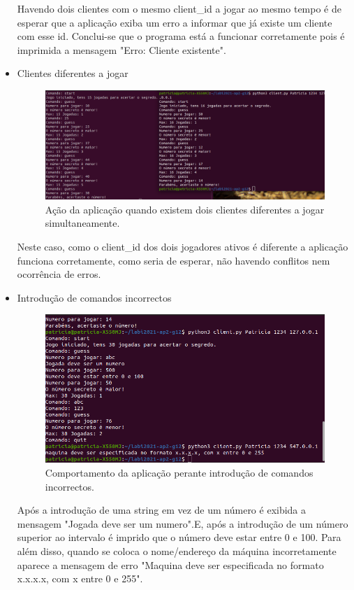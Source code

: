\documentclass{report}
\begin{document}
\begin{itemize}
Havendo dois clientes com o mesmo client\_id a jogar ao mesmo tempo é de esperar que a aplicação exiba um erro a informar que já existe um cliente com esse id. Conclui-se que o programa está a funcionar corretamente pois é imprimida a mensagem "Erro: Cliente existente".

\item Clientes diferentes a jogar
\begin{figure}[H]
        \centering
        \includegraphics[scale=0.36]{doisclients}      
        \caption{Ação da aplicação quando existem dois clientes diferentes a jogar simultaneamente.}
\end{figure}

Neste caso, como o client\_id dos dois jogadores ativos é diferente a aplicação funciona corretamente, como seria de esperar, não havendo conflitos nem ocorrência de erros.

\item Introdução de comandos incorrectos
\begin{figure}[H]
        \centering
        \includegraphics[scale=0.53]{errospropositados}      
        \caption{Comportamento da aplicação perante introdução de comandos incorrectos.}
\end{figure}

Após a introdução de uma string em vez de um número é exibida a mensagem "Jogada deve ser um numero".E, após a introdução de um número superior ao intervalo é imprido que o número deve estar entre 0 e 100. Para além disso, quando se coloca o nome/endereço da máquina incorretamente aparece a mensagem de erro "Maquina deve ser especificada no formato x.x.x.x, com x entre 0 e 255".


\end{itemize}
\end{document}
